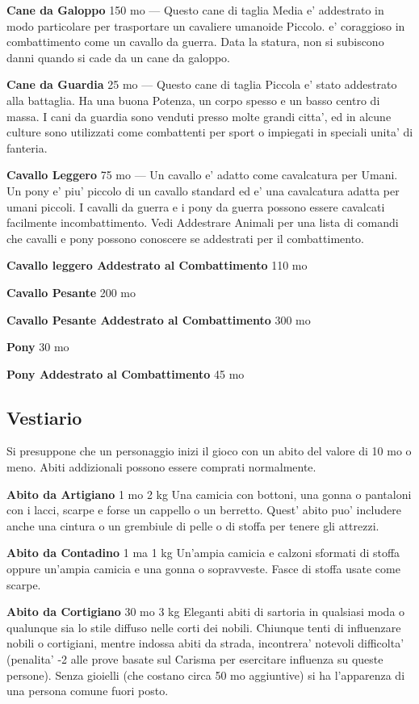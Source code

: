 \documentclass[a4paper,11pt,twoside,openany]{book}
\begin{document}
{\textbf{Cane da Galoppo} 150 mo --- Questo cane di taglia Media e' addestrato in modo particolare per trasportare un cavaliere umanoide Piccolo. e' coraggioso in combattimento come un cavallo da guerra. Data la statura, non si subiscono danni quando si cade da un cane da galoppo.

\textbf{Cane da Guardia} 25 mo --- Questo cane di taglia Piccola e' stato addestrato alla battaglia. Ha una buona Potenza, un corpo spesso e un basso centro di massa. I cani da guardia sono venduti presso molte grandi citta', ed in alcune culture sono utilizzati come combattenti per sport o impiegati in speciali unita' di fanteria.

\textbf{Cavallo Leggero} 75 mo --- Un cavallo e' adatto come cavalcatura per Umani. Un pony e' piu' piccolo di un cavallo standard ed e' una cavalcatura adatta per umani piccoli. I cavalli da guerra e i pony da guerra possono essere cavalcati facilmente incombattimento.
Vedi Addestrare Animali per una lista di comandi che cavalli e pony possono conoscere se addestrati per il combattimento.

\textbf{Cavallo leggero Addestrato al Combattimento} 110 mo

\textbf{Cavallo Pesante} 200 mo

\textbf{Cavallo Pesante Addestrato al Combattimento} 300 mo

\textbf{Pony} 30 mo

\textbf{Pony Addestrato al Combattimento} 45 mo

\pagebreak

\subsection{Vestiario}

\label{vestiario}

Si presuppone che un personaggio inizi il gioco con un abito del valore di 10 mo o meno. Abiti addizionali possono essere comprati normalmente.

\textbf{Abito da Artigiano} 1 mo 2 kg Una camicia con bottoni, una gonna o pantaloni con i lacci, scarpe e forse un cappello o un berretto. Quest' abito puo' includere anche una cintura o un grembiule di pelle o di stoffa per tenere gli attrezzi.

\textbf{Abito da Contadino} 1 ma 1 kg Un'ampia camicia e calzoni sformati di stoffa oppure un'ampia camicia e una gonna o sopravveste. Fasce di stoffa usate come scarpe.

\textbf{Abito da Cortigiano} 30 mo 3 kg Eleganti abiti di sartoria in qualsiasi moda o qualunque sia lo stile diffuso nelle corti dei nobili. Chiunque tenti di influenzare nobili o cortigiani, mentre indossa abiti da strada, incontrera' notevoli difficolta' (penalita' -2 alle prove basate sul Carisma per esercitare influenza su queste persone). Senza gioielli (che costano circa 50 mo aggiuntive) si ha l'apparenza di una persona comune fuori posto.

}
\end{document}
